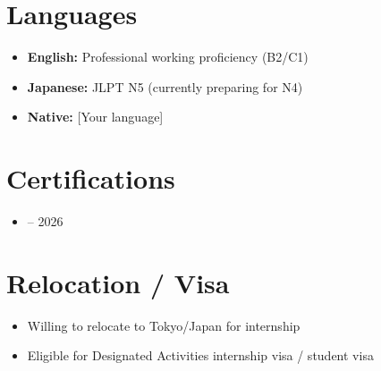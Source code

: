 \documentclass[11pt, letterpaper]{article}
\begin{document}
\section{Languages}
\begin{itemize}
  \item \textbf{English:} Professional working proficiency (B2/C1)
  \item \textbf{Japanese:} JLPT N5 (currently preparing for N4) %
  \item \textbf{Native:} [Your language]
\end{itemize}

\section{Certifications}
\begin{itemize}
  \item [AWS, Coursera, etc.] -- 2026
\end{itemize}

\section{Relocation / Visa}
\begin{itemize}
  \item Willing to relocate to Tokyo/Japan for internship
  \item [If applicable:] Eligible for Designated Activities internship visa / student visa
\end{itemize}
\end{document}
